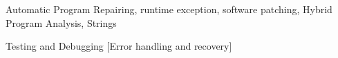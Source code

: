 \documentclass{sig-alternate}
\begin{document}
\begin{abstract}


\end{abstract}

% 
\keywords
{
Automatic Program Repairing, 
runtime exception, 
software patching,
Hybrid Program Analysis,
Strings}

{Testing and Debugging }
[Error handling and recovery]











\clearpage

\small
%


\end{document}
